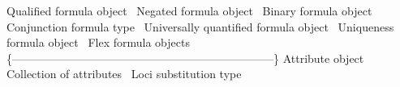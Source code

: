 \LA{}Qualified formula object~{\nwtagstyle{}}\RA{}
\LA{}Negated formula object~{\nwtagstyle{}}\RA{}
\LA{}Binary formula object~{\nwtagstyle{}}\RA{}
\LA{}Conjunction formula type~{\nwtagstyle{}}\RA{}
\LA{}Universally quantified formula object~{\nwtagstyle{}}\RA{}
\LA{}Uniqueness formula object~{\nwtagstyle{}}\RA{}
\LA{}Flex formula objects~{\nwtagstyle{}}\RA{}
\{---------------------------------------------------------------------\}
\LA{}Attribute object~{\nwtagstyle{}}\RA{}
\LA{}Collection of attributes~{\nwtagstyle{}}\RA{}
\LA{}Loci substitution type~{\nwtagstyle{}}\RA{}

\nwendcode{}\nwdocspar

